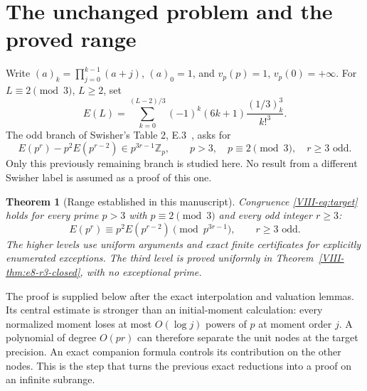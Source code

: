 \documentclass[11pt,letterpaper]{article}
\newtheorem{theorem}{Theorem}[section]
\numberwithin{equation}{section}
\begin{document}
\section{The unchanged problem and the proved range}\label{loc-VIII-1}
Write $(a)_k=\prod_{j=0}^{k-1}(a+j)$, $(a)_0=1$, and
$v_p(p)=1$, $v_p(0)=+\infty$. For $L\equiv2\pmod3$, $L\ge2$, set
\[
 E(L)=\sum_{k=0}^{(L-2)/3}(-1)^k(6k+1)
       \frac{(1/3)_k^3}{k!^3}.
\]
The odd branch of Swisher's Table 2, E.3~\cite{VIII-Swisher}, asks for
\begin{equation}\label{VIII-eq:target}
 E(p^r)-p^2E(p^{r-2})\in p^{3r-1}\mathbb Z_p,
 \qquad p>3,\quad p\equiv2\pmod3,\quad r\ge3\text{ odd}.
\end{equation}
Only this previously remaining branch is studied here. No result
from a different Swisher label is assumed as a proof of this one.

\begin{theorem}[Range established in this manuscript]\label{VIII-thm:main-range}
Congruence \eqref{VIII-eq:target} holds for every prime $p>3$ with
$p\equiv2\pmod3$ and every odd integer $r\ge3$:
\[
 \boxed{E(p^r)\equiv p^2E(p^{r-2})\pmod{p^{3r-1}},\qquad r\ge3\text{ odd}.}
\]
The higher levels use uniform arguments and exact finite certificates
for explicitly enumerated exceptions. The third level is proved uniformly
in Theorem~\ref{VIII-thm:e8-r3-closed}, with no exceptional prime.
\end{theorem}

The proof is supplied below after the exact interpolation and
valuation lemmas. Its central estimate is stronger than an
initial-moment calculation: every normalized moment loses at most
$O(\log j)$ powers of $p$ at moment order $j$. A polynomial of
degree $O(pr)$ can therefore separate the unit nodes at the target
precision. An exact companion formula controls its contribution
on the other nodes. This is the step that turns the previous
exact reductions into a proof on an infinite subrange.
\end{document}
